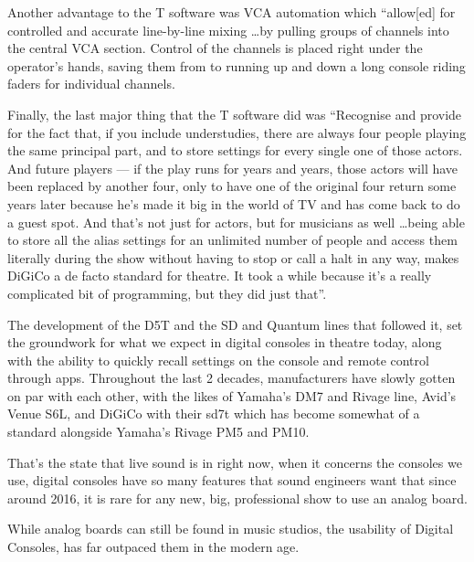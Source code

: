 \documentclass[12pt]{article}
\def\dg{DiGiCo}
\begin{document}
\begin{doublespace}
\par Another advantage to the T software was VCA automation which  ``allow[ed] for controlled and accurate line-by-line mixing \dots by pulling groups of channels into the central VCA section. Control of the channels is placed right under the operator's hands, saving them from to running up and down a long console riding faders for individual channels. \autocite{gillmoreBriefHistoryTheatre2016}
\par Finally, the last major thing that the T software did was ``Recognise and provide for the fact that, if you include understudies, there are always four people playing the same principal part, and to store settings for every single one of those actors. And future players --- if the play runs for years and years, those actors will have been replaced by another four, only to have one of the original four return some years later because he's made it big in the world of TV and has come back to do a guest spot. And that's not just for actors, but for musicians as well \dots being able to store all the alias settings for an unlimited number of people and access them literally during the show without having to stop or call a halt in any way, makes DiGiCo a de facto standard for theatre. It took a while because it's a really complicated bit of programming, but they did just that''.
\par The development of the D5T and the SD and Quantum lines that followed it, set the groundwork for what we expect in digital consoles in theatre today, along with the ability to quickly recall settings on the console and remote control through apps. Throughout the last 2 decades, manufacturers have slowly gotten on par with each other, with the likes of Yamaha's DM7 and Rivage line, Avid's Venue S6L, and \dg{} with their sd7t which has become somewhat of a standard alongside Yamaha's Rivage PM5 and PM10.
\par That's the state that live sound is in right now, when it concerns the consoles we use, digital consoles have so many features that sound engineers want that since around 2016, it is rare for any new, big, professional show to use an analog board.
\par While analog boards can still be found in music studios, the usability of Digital Consoles, has far outpaced them in the modern age.

\newpage
\nocite{*}
\printbibliography
\end{doublespace}
\end{document}
